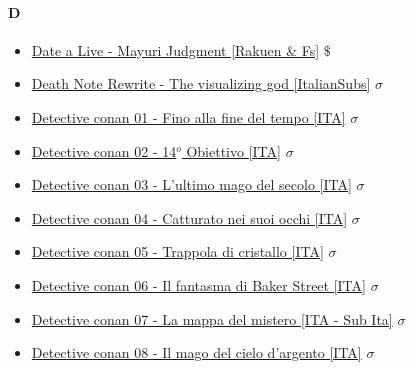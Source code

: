 		\paragraph{D} \hypertarget{FD}{}
			\begin{itemize}
				
				\item \href{https://mega.nz/#F!bP4ynSrY!fGJLlmc3LclALm7cIspGsQ} {Date a Live - Mayuri Judgment [Rakuen \& Fs]}  $\$$   \\
				\item \href{https://mega.nz/#!hPoBTLCD!Las69AiW7P8voyDj4MozGcZq0NnqJqBbD4Qn4KKNLh0} {Death Note Rewrite - The visualizing god [ItalianSubs]}  $\sigma$   \\
				\item \href{https://mega.nz/#!oZcEhLhT!355UkzT4MhGCWnwot9imMiDcX_e10RP973-S7rWCKrY} {Detective conan 01 - Fino alla fine del tempo [ITA]}  $\sigma$   \\
				\item \href{https://mega.nz/#!lIdFwKwJ!1EaUp3-u8ZeKkRrlNT2VOxigkUhHUGxxgTdNqCJTyUU} {Detective conan 02 - 14$ ^{o} $ Obiettivo [ITA]}  $\sigma$   \\
				\item \href{https://mega.nz/#!cVVEyJgL!3rEJGaCJi9rFD5UUDffvYNPD_Kp4KW8--F-BHdCIiNU} {Detective conan 03 - L'ultimo mago del secolo [ITA]}  $\sigma$   \\
				\item \href{https://mega.nz/#!tFN00brQ!JSk9lf5Uux0CW_1ZQNw3jtPpPo96D1YM2Nxm11o4aTo} {Detective conan 04 - Catturato nei suoi occhi [ITA]}  $\sigma$   \\
				\item \href{https://mega.nz/#!pYU1WYrT!15O1V-_M5NfGXNN9c8akHiAU-5h7if5TS0o_qE6yiu0} {Detective conan 05 - Trappola di cristallo [ITA]}  $\sigma$   \\
				\item \href{https://mega.nz/#!UAtlhJZQ!ZgbFnfLYcpqhYZyIdfbFwWuE03z9PdxiXG-5LgSiOVU} {Detective conan 06 - Il fantasma di Baker Street  [ITA]}  $\sigma$   \\
				\item \href{https://mega.nz/#!II9HDJYJ!dPHwExdtwRpEOtd_nJQ4hdUscKq4Jg3jZYBJNSqy92U} {Detective conan 07 - La mappa del mistero  [ITA - Sub Ita]}  $\sigma$   \\
				\item \href{https://mega.nz/#!5V821QYa!WJgTcMEanz9KwBtCEGKW027tITWdwDyD6ghqyEOJbgA} {Detective conan 08 - Il mago del cielo d'argento  [ITA]}  $\sigma$   \\

\end{itemize}
